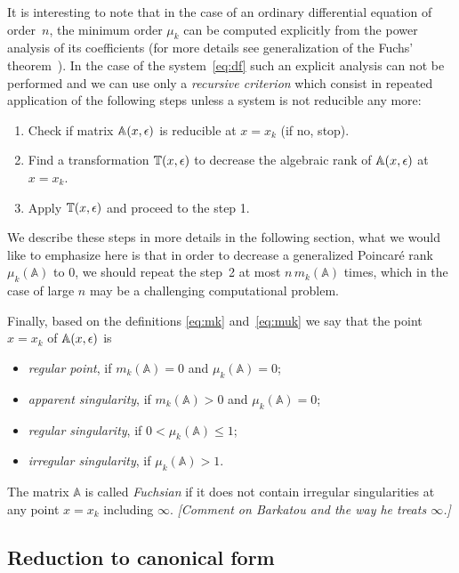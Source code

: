 \documentclass[12pt,a4paper]{article}
\def\M#1{\mathbb{#1}} %
\begin{document}
It is interesting to note that in the case of an ordinary differential equation of order~$n$, the minimum order $\mu_k$ can be computed explicitly from the power analysis of its coefficients (for more details see generalization of the Fuchs' theorem~\cite{Mos59}).
In the case of the system~\eqref{eq:df} such an explicit analysis can not be performed and we can use only a {\em recursive criterion} which consist in repeated application of the following steps unless a system is not reducible any more:
\begin{enumerate}
  \item Check if matrix $\M A(x,\eps)$ is reducible at $x=x_k$ (if no, stop).
  \item Find a transformation $\M T(x,\eps)$ to decrease the algebraic rank of $\M A(x,\eps)$ at $x=x_k$.
  \item Apply $\M T(x,\eps)$ and proceed to the step 1.
\end{enumerate}
We describe these steps in more details in the following section, what we would like to emphasize here is that in order to decrease a generalized Poincar\'e rank $\mu_k(\M A)$ to 0, we should repeat the step~2 at most $n\, m_k(\M A)$ times, which in the case of large $n$ may be a challenging computational problem.

Finally, based on the definitions \eqref{eq:mk} and~\eqref{eq:muk} we say that the point $x=x_k$ of $\M A(x,\eps)$ is
\begin{itemize}
  \item {\em regular point}, if $m_k(\M A) = 0$ and $\mu_k(\M A) = 0$;
  \item {\em apparent singularity}, if $m_k(\M A) > 0$ and $\mu_k(\M A) = 0$;
  \item {\em regular singularity}, if $0 < \mu_k(\M A) \le 1$;
  \item {\em irregular singularity}, if $\mu_k(\M A) > 1$.
\end{itemize}
The matrix $\M A$ is called {\em Fuchsian} if it does not contain irregular singularities at any point $x=x_k$ including $\infty$.
{\em [Comment on Barkatou and the way he treats $\infty$.]}


\subsection{Reduction to canonical form}
\end{document}
